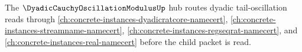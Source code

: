 The $\DyadicCauchyOscillationModulusUp$ hub routes dyadic tail-oscillation reads through \autoref{ch:concrete-instances-dyadicratcore-namecert}, \autoref{ch:concrete-instances-streamname-namecert}, \autoref{ch:concrete-instances-regseqrat-namecert}, and \autoref{ch:concrete-instances-real-namecert} before the child packet is read.

